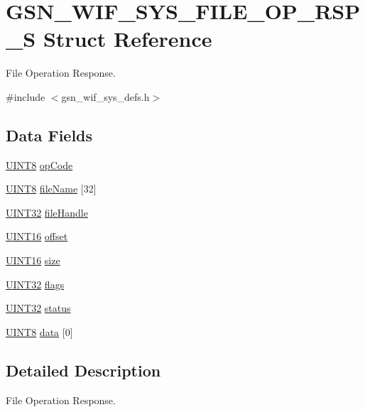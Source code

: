 \hypertarget{a00351}{
\section{GSN\_\-WIF\_\-SYS\_\-FILE\_\-OP\_\-RSP\_\-S Struct Reference}
\label{a00351}
}


File Operation Response.  




{\ttfamily \#include $<$gsn\_\-wif\_\-sys\_\-defs.h$>$}

\subsection*{Data Fields}
\begin{DoxyCompactItemize}
\item 
\hyperlink{a00660_gab27e9918b538ce9d8ca692479b375b6a}{UINT8} \hyperlink{a00351_adcf88f6496d374c89792872ab087189d}{opCode}
\item 
\hyperlink{a00660_gab27e9918b538ce9d8ca692479b375b6a}{UINT8} \hyperlink{a00351_a44211bff423210b4e239a8616f8bbd33}{fileName} \mbox{[}32\mbox{]}
\item 
\hyperlink{a00660_gae1e6edbbc26d6fbc71a90190d0266018}{UINT32} \hyperlink{a00351_a31636a2d20d4a83f03ddba7c789cb00a}{fileHandle}
\item 
\hyperlink{a00660_ga09f1a1fb2293e33483cc8d44aefb1eb1}{UINT16} \hyperlink{a00351_af7c1ea69079dc905761ed0a19ec036ab}{offset}
\item 
\hyperlink{a00660_ga09f1a1fb2293e33483cc8d44aefb1eb1}{UINT16} \hyperlink{a00351_a68890417cb73114517d0d8c594bd282e}{size}
\item 
\hyperlink{a00660_gae1e6edbbc26d6fbc71a90190d0266018}{UINT32} \hyperlink{a00351_a5a821be372043cabb6e452c3ce9bc068}{flags}
\item 
\hyperlink{a00660_gae1e6edbbc26d6fbc71a90190d0266018}{UINT32} \hyperlink{a00351_ac6b7193d1fe7063cf448ef96398230d8}{status}
\item 
\hyperlink{a00660_gab27e9918b538ce9d8ca692479b375b6a}{UINT8} \hyperlink{a00351_a29500e452cff835f2b70d1dff36f918a}{data} \mbox{[}0\mbox{]}
\end{DoxyCompactItemize}


\subsection{Detailed Description}
File Operation Response. 

